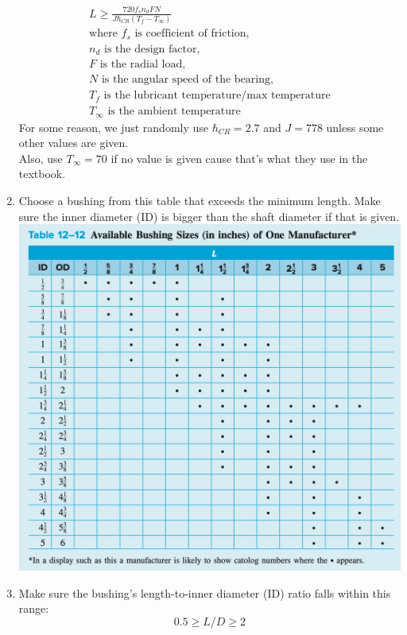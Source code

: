 \documentclass[11pt, fleqn]{article}
\begin{document}
\begin{enumerate}
    \begin{align*}
        L \geq \frac{720f_s n_d FN}{J\hbar_{CR}(T_f-T_{\infty})}\\
        \text{where $f_s$ is coefficient of friction,}\\
        \text{$n_d$ is the design factor,}\\
        \text{$F$ is the radial load,}\\
        \text{$N$ is the angular speed of the bearing,}\\
        \text{$T_f$ is the lubricant temperature/max temperature}\\
        \text{$T_\infty$ is the ambient temperature}
    \end{align*}
    For some reason, we just randomly use $\hbar_{CR} = 2.7$ and $J = 778$ unless some other values are given.\\
    Also, use $T_{\infty} = 70$ if no value is given cause that's what they use in the textbook.
    \item Choose a bushing from this table that exceeds the minimum length. Make sure the inner diameter (ID) is bigger than the shaft diameter if that is given.\\
    \includegraphics[scale=0.55]{Bearings/available-bushings.png}\\
    \item Make sure the bushing's length-to-inner diameter (ID) ratio falls within this range:
    $$0.5 \geq L/D \geq 2$$

\end{enumerate}
\end{document}
